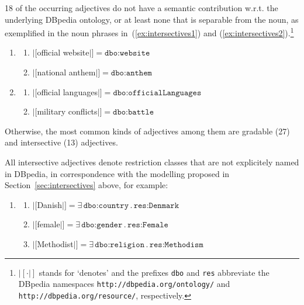 \documentclass[11pt]{article}
\begin{document}
18 of the occurring adjectives do not have a semantic contribution w.r.t. the underlying DBpedia ontology, or at least none that is separable from the noun, 
as exemplified in the noun phrases in~(\ref{ex:intersectives1}) and (\ref{ex:intersectives2}).\footnote{$|[\cdot|]$ stands for 
`denotes' and the prefixes \texttt{dbo} and \texttt{res} abbreviate the DBpedia namespaces \texttt{http://dbpedia.org/ontology/}
and \texttt{http://dbpedia.org/resource/}, respectively.}
\begin{enumerate}
\item \begin{enumerate}
 \item $|[$official website$|]=\texttt{dbo:website}$
 \item $|[$national anthem$|]=\texttt{dbo:anthem}$
 \end{enumerate}
 \label{ex:intersectives1}
\item \begin{enumerate}
 \item $|[$official languages$|]=\texttt{dbo:officialLanguages}$
 \item $|[$military conflicts$|]=\texttt{dbo:battle}$ 
 \end{enumerate}
 \label{ex:intersectives2}
\end{enumerate}

Otherwise, the most common kinds of adjectives among them are gradable (27) and intersective (13) adjectives.

All intersective adjectives denote restriction classes that are not explicitely named in DBpedia, 
in correspondence with the modelling proposed in Section~\ref{sec:intersectives} above, for example:
\begin{enumerate}
\item \begin{enumerate}
 \item $|[$Danish$|]=\exists\,\texttt{dbo:country}\,.\,\texttt{res:Denmark}$
 \item $|[$female$|]=\exists\,\texttt{dbo:gender}\,.\,\texttt{res:Female}$
 \item $|[$Methodist$|]=\exists\,\texttt{dbo:religion}\,.\,\texttt{res:Methodism}$
 \end{enumerate}
\end{enumerate}
\end{document}

